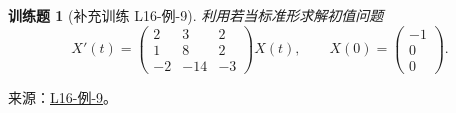 \documentclass[UTF8,12pt,a4paper,fontset=fandol]{ctexart}
\newtheorem{exercise}{训练题}[section]
\begin{document}
\begin{exercise}[补充训练 L16-例-9]\label{prob:L16-例-9}
利用若当标准形求解初值问题
    \[
        X'(t)=\begin{pmatrix}
            2 & 3 & 2 \\ 1 & 8 & 2 \\ -2 & -14 & -3
        \end{pmatrix}X(t),\qquad
        X(0)=\begin{pmatrix}
            -1 \\ 0 \\ 0
        \end{pmatrix}.
    \]
\end{exercise}
\noindent 来源：\href{https://github.com/yhwu-is/Linear-Algebra-Left-Undone/blob/new/%E8%AE%B2%E4%B9%89/%E4%B8%93%E9%A2%98/16%20%E8%8B%A5%E5%BD%93%E6%A0%87%E5%87%86%E5%BD%A2.tex}{L16-例-9}。
\end{document}
